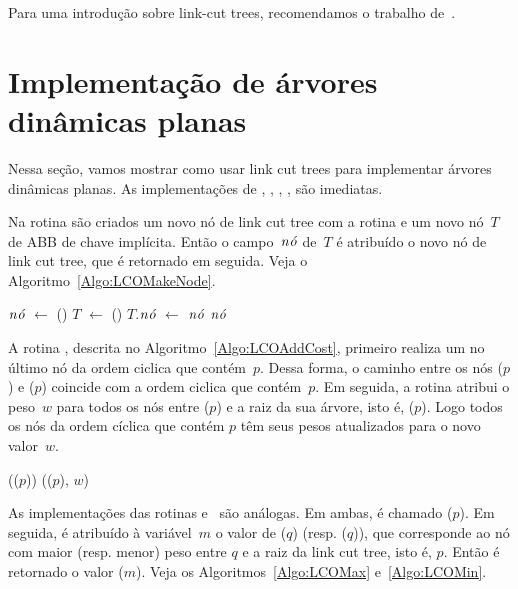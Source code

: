 Para uma introdução sobre link-cut trees, recomendamos o trabalho de~\cite{linkcuttree}.

\section{Implementação de árvores dinâmicas planas}
\label{sec:implementacao-ADP}

Nessa seção, vamos mostrar como usar link cut trees para implementar árvores dinâmicas planas. As implementações de \LCOMakeNode{}, \LCOAddCost{}, \LCOMax{}, \LCOMin, \LCOFindNode{} são imediatas.

Na rotina \LCOMakeNode{} são criados um novo nó de link cut tree com a rotina \linkcutCreate{} e um novo nó~$T$ de ABB de chave implícita.
Então o campo~$\mathit{n\acute{o}}$ de~$T$ é atribuído o novo nó de link cut tree, que é retornado em seguida. Veja o Algoritmo~\ref{Algo:LCOMakeNode}.

\begin{algorithm}[htb]
\caption{\LCOMakeNode()}
\label{Algo:LCOMakeNode}
\begin{algorithmic}[1]
\State $\mathit{n\acute{o}}$ $\gets$ \linkcutCreate()
\State $T$ $\gets$ \treapCreate()
\State $T$.$\mathit{n\acute{o}}$ $\gets$ $\mathit{n\acute{o}}$
\State \Return $\mathit{n\acute{o}}$
\end{algorithmic}
\end{algorithm}

A rotina \LCOAddCost{}, descrita no Algoritmo~\ref{Algo:LCOAddCost}, primeiro realiza um \linkcutEvert{} no último nó da ordem ciclica que contém~$p$.
Dessa forma, o caminho entre os nós \treapFirst($p$) e \treapLast($p$) coincide com a ordem ciclica que contém~$p$.
Em seguida, a rotina \linkcutWeight{} atribui o peso~$w$ para todos os nós entre \treapFirst($p$) e a raiz da sua árvore, isto é, \treapLast($p$).
Logo todos os nós da ordem cíclica que contém $p$ têm seus pesos atualizados para o novo valor~$w$.

\begin{algorithm}[htb]
\caption{\LCOAddCost($p$, $w$)}
\label{Algo:LCOAddCost}
\begin{algorithmic}[1]
\State \linkcutEvert(\treapLast($p$))
\State \linkcutWeight(\treapFirst($p$), $w$)
\end{algorithmic}
\end{algorithm}

As implementações das rotinas \LCOMax{} e~\LCOMin{} são análogas.
Em ambas, é chamado \linkcutEvert($p$).
Em seguida, é atribuído à variável~$m$ o valor de \linkcutMax($q$) (resp. \linkcutMin($q$)), que corresponde ao nó com maior (resp. menor) peso entre $q$ e a raiz da link cut tree, isto é, $p$.
Então é retornado o valor \LCOFindNode($m$).
Veja os Algoritmos~\ref{Algo:LCOMax} e~\ref{Algo:LCOMin}.

